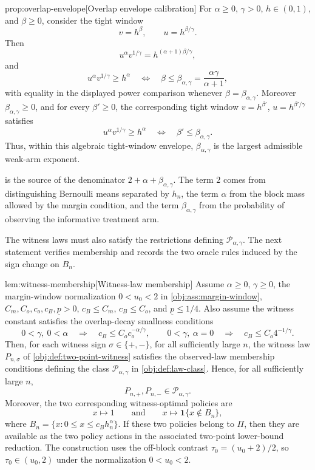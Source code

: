\documentclass[11pt]{article}
\begin{document}
\begin{propositionv}{prop:overlap-envelope}[Overlap envelope calibration]
For \(\alpha\ge0\), \(\gamma>0\), \(h\in(0,1)\), and \(\beta\ge0\), consider the tight window
\[
v=h^\beta,
\qquad
u=h^{\beta/\gamma}.
\]
Then
\[
u^\alpha v^{1/\gamma}
=
h^{(\alpha+1)\beta/\gamma},
\]
and
\[
u^\alpha v^{1/\gamma}\ge h^\alpha
\quad\Longleftrightarrow\quad
\beta\le \beta_{\alpha,\gamma}=\frac{\alpha\gamma}{\alpha+1},
\]
with equality in the displayed power comparison whenever \(\beta=\beta_{\alpha,\gamma}\). Moreover \(\beta_{\alpha,\gamma}\ge0\), and for every \(\beta'\ge0\), the corresponding tight window \(v=h^{\beta'}\), \(u=h^{\beta'/\gamma}\) satisfies
\[
u^\alpha v^{1/\gamma}\ge h^\alpha
\quad\Longleftrightarrow\quad
\beta'\le\beta_{\alpha,\gamma}.
\]
Thus, within this algebraic tight-window envelope, \(\beta_{\alpha,\gamma}\) is the largest admissible weak-arm exponent.
\end{propositionv}

 is the source of the denominator \(2+\alpha+\beta_{\alpha,\gamma}\).  The term \(2\) comes from distinguishing Bernoulli means separated by \(h_n\), the term \(\alpha\) from the block mass allowed by the margin condition, and the term \(\beta_{\alpha,\gamma}\) from the probability of observing the informative treatment arm.

The witness laws must also satisfy the restrictions defining \(\mathcal P_{\alpha,\gamma}\).  The next statement verifies membership and records the two oracle rules induced by the sign change on \(B_n\).

\begin{lemmav}{lem:witness-membership}[Witness-law membership]
Assume \(\alpha\ge0\), \(\gamma\ge0\), the margin-window normalization \(0<u_0<2\) in \cref{obj:ass:margin-window}, \(C_m,C_o,c_o,c_B,\underline p>0\), \(c_B\le C_m\), \(c_B\le C_o\), and \(\underline p\le 1/4\). Also assume the witness constant satisfies the overlap-decay smallness conditions
\[
0<\gamma,\ 0<\alpha
\quad\Longrightarrow\quad
c_B\le C_o c_o^{-\alpha/\gamma},
\qquad
0<\gamma,\ \alpha=0
\quad\Longrightarrow\quad
c_B\le C_o 4^{-1/\gamma}.
\]
Then, for each witness sign \(\sigma\in\{+,-\}\), for all sufficiently large \(n\), the witness law \(P_{n,\sigma}\) of \cref{obj:def:two-point-witness} satisfies the observed-law membership conditions defining the class \(\mathcal P_{\alpha,\gamma}\) in \cref{obj:def:law-class}. Hence, for all sufficiently large \(n\),
\[
P_{n,+},P_{n,-}\in \mathcal P_{\alpha,\gamma}.
\]
Moreover, the two corresponding witness-optimal policies are
\[
x\mapsto 1
\qquad\text{and}\qquad
x\mapsto \mathbf 1\{x\notin B_n\},
\]
where \(B_n=\{x:0\le x\le c_B h_n^\alpha\}\). If these two policies belong to \(\Pi\), then they are available as the two policy actions in the associated two-point lower-bound reduction. The construction uses the off-block contrast \(\tau_0=(u_0+2)/2\), so \(\tau_0\in(u_0,2)\) under the normalization \(0<u_0<2\).
\end{lemmav}
\end{document}
